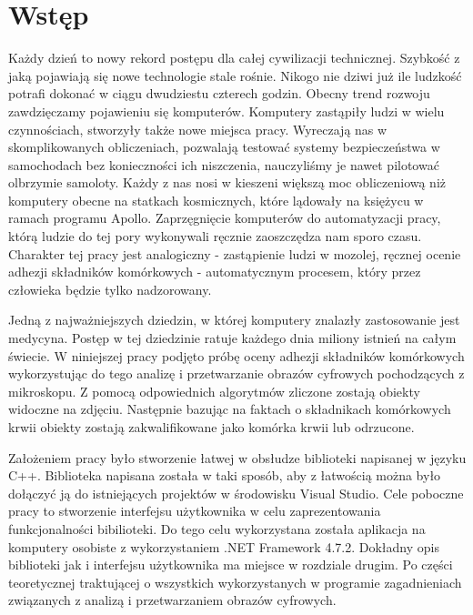 \documentclass{article}
\begin{document}
    \section{Wstęp}
    {
        \Large
        \justifying
        \quad 
        Każdy dzień to nowy rekord postępu dla całej cywilizacji technicznej.
        Szybkość z jaką pojawiają się nowe technologie stale rośnie.
        Nikogo nie dziwi już ile ludzkość potrafi dokonać w ciągu dwudziestu czterech godzin.
        Obecny trend rozwoju zawdzięczamy pojawieniu się komputerów.
        Komputery zastąpiły ludzi w wielu czynnościach, stworzyły także nowe miejsca pracy.
        Wyreczają nas w skomplikowanych obliczeniach, pozwalają testować systemy bezpieczeństwa w samochodach bez konieczności ich niszczenia, nauczyliśmy je nawet pilotować olbrzymie samoloty.
        Każdy z nas nosi w kieszeni większą moc obliczeniową niż komputery obecne na statkach kosmicznych, które lądowały na księżycu w ramach programu Apollo.
        Zaprzęgnięcie komputerów do automatyzacji pracy, którą ludzie do tej pory wykonywali ręcznie zaoszczędza nam sporo czasu.
        Charakter tej pracy jest analogiczny - zastąpienie ludzi w mozolej, ręcznej ocenie adhezji składników komórkowych -
        automatycznym procesem, który przez człowieka będzie tylko nadzorowany.
    }
    
    \vspace{0.5cm}
    {
        \Large
        \justifying
        Jedną z najważniejszych dziedzin, w której komputery znalazły zastosowanie jest medycyna.
        Postęp w tej dziedzinie ratuje każdego dnia miliony istnień na całym świecie.
        W niniejszej pracy podjęto próbę oceny adhezji składników komórkowych wykorzystując do tego analizę i przetwarzanie obrazów cyfrowych pochodzących z mikroskopu.
        Z pomocą odpowiednich algorytmów zliczone zostają obiekty widoczne na zdjęciu.
        Następnie bazując na faktach o składnikach komórkowych krwii obiekty zostają zakwalifikowane jako komórka krwii lub odrzucone.
    }

    \vspace{0.5cm}
    {
        \Large
        \justifying
        Założeniem pracy było stworzenie łatwej w obsłudze biblioteki napisanej w języku C++.
        Biblioteka napisana została w taki sposób, aby z łatwością można było dołączyć ją do istniejących projektów w środowisku Visual Studio.
        Cele poboczne pracy to stworzenie interfejsu użytkownika w celu zaprezentowania funkcjonalności bibilioteki.
        Do tego celu wykorzystana została aplikacja na komputery osobiste z wykorzystaniem .NET Framework 4.7.2.
        Dokładny opis biblioteki jak i interfejsu użytkownika ma miejsce w rozdziale drugim.
        Po części teoretycznej traktującej o wszystkich wykorzystanych w programie zagadnieniach związanych z analizą i przetwarzaniem obrazów cyfrowych.
    }
\end{document}
